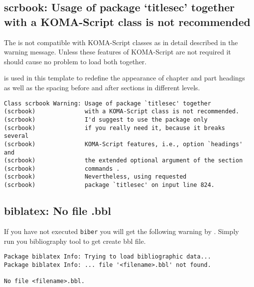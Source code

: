 \subsection{scrbook: Usage of package `titlesec' together with a KOMA-Script class is not recommended}

The  is not compatible with KOMA-Script classes as in
detail described in the warning message. Unless these features of KOMA-Script
are not required it should cause no problem to load both together. 

 is used in this template to redefine the appearance of 
chapter and part headings as well as the spacing before and after 
sections in different levels.

\begin{verbatim}
Class scrbook Warning: Usage of package `titlesec' together
(scrbook)              with a KOMA-Script class is not recommended.
(scrbook)              I'd suggest to use the package only
(scrbook)              if you really need it, because it breaks several
(scrbook)              KOMA-Script features, i.e., option `headings' and
(scrbook)              the extended optional argument of the section
(scrbook)              commands .
(scrbook)              Nevertheless, using requested
(scrbook)              package `titlesec' on input line 824.
\end{verbatim}


\subsection{biblatex: No file \texorpdfstring{}{filename}.bbl}

If you have not executed \texttt{biber} you will get the following warning by
. Simply run you bibliography tool to get create bbl file.

\begin{verbatim}
Package biblatex Info: Trying to load bibliographic data...
Package biblatex Info: ... file '<filename>.bbl' not found.

No file <filename>.bbl.
\end{verbatim}

%

